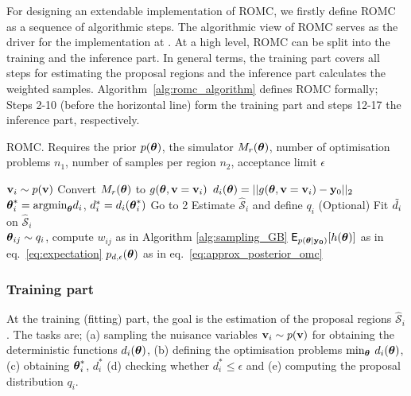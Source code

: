 For designing an extendable implementation of ROMC, we firstly define
ROMC as a sequence of algorithmic steps. The algorithmic view of ROMC
serves as the driver for the implementation at . At a high
level, ROMC can be split into the training and the inference part. In
general terms, the training part covers all steps for estimating the
proposal regions and the inference part calculates the weighted
samples. Algorithm~\ref{alg:romc_algorithm} defines ROMC formally;
Steps 2-10 (before the horizontal line) form the training part and
steps 12-17 the inference part, respectively.

\begin{algorithm}[!ht]
	\caption{ROMC. Requires the prior \( p(\boldsymbol{\theta}) \), the simulator
    \(M_r(\boldsymbol{\theta})\), number of optimisation problems \(n_1\), number
    of samples per region \(n_2\), acceptance limit
    \(\epsilon\)}\label{alg:romc_algorithm}
	\begin{algorithmic}[1]
    \State \(\mathbf{v}_i \sim p(\mathbf{v})\) 
    \State Convert \(M_r(\boldsymbol{\theta}) \) to \( g(\boldsymbol{\theta}, \mathbf{v}=\mathbf{v}_i) \) 
      \State \( d_i(\boldsymbol{\theta}) = ||g(\boldsymbol{\theta}, \mathbf{v}=\mathbf{v}_i) - \mathbf{y}_0||_2 \) 
      \State \(\boldsymbol{\theta}_i^* = \text{argmin}_{\boldsymbol{\theta}} d_i\), \(d_i^*=d_i(\boldsymbol{\theta}_i^*)\) 
        \State Go to 2 
      \EndIf
      \State Estimate \(\mathcal{\hat{S}}_i\) and define \(q_i\) 
      \State (Optional) Fit \(\Tilde{d}_i\) on \(\mathcal{\hat{S}}_i\) 
      \\\hrulefill
      \State \(\boldsymbol{\theta}_{ij} \sim q_i\), compute \(w_{ij}\) as in Algorithm \ref{alg:sampling_GB} 
      \EndFor
    \EndFor
    \State \(\mathsf{E}_{p(\boldsymbol{\theta}|\mathbf{y_0})}[h(\boldsymbol{\theta})]\) as in eq.~\eqref{eq:expectation} 
    \State \(p_{d,\epsilon}(\boldsymbol{\theta}) \) as in eq.~\eqref{eq:approx_posterior_omc} 
    \EndProcedure
	\end{algorithmic}
\end{algorithm}

\subsubsection*{Training part}
\noindent
At the training (fitting) part, the goal is the estimation of the
proposal regions \(\mathcal{\hat{S}}_i\). The tasks are; (a) sampling
the nuisance variables \(\mathbf{v}_i \sim p(\mathbf{v})\) for obtaining the
deterministic functions \(d_i(\boldsymbol{\theta})\), (b) defining the optimisation
problems \(\min_{\boldsymbol{\theta}} \: d_i(\boldsymbol{\theta})\), (c) obtaining
\(\boldsymbol{\theta}_i^*\), \(d_i^*\) (d) checking whether \(d_i^* \leq \epsilon\) and
(e) computing the proposal distribution \(q_i\).

